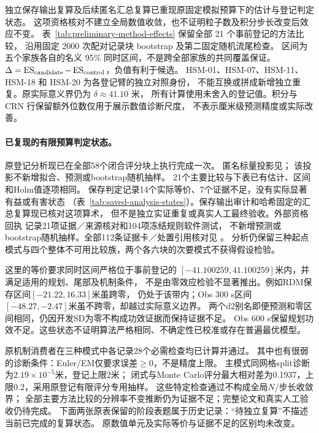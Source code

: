 独立保存输出复算及后续匿名汇总复算已重现原固定模拟预算下的估计与登记判定状态。
这项资格核对不建立全局数值收敛，也不证明粒子数及积分步长改变后效应不变。
表~\ref{tab:preliminary-method-effects} 保留全部 21 个事前登记的方法比较，
沿用固定 2000 次配对记录块 bootstrap 及第二固定随机流尾检查。
区间为五个家族各自的名义 95\% 同时区间，不是跨全部家族的共同覆盖保证。
$\Delta=\operatorname{ES}_{\mathrm{candidate}}-\operatorname{ES}_{\mathrm{control}}$，负值有利于候选。
HSM-01、HSM-07、HSM-11、HSM-18 和 HSM-20 为各登记臂的独立对照身份，
不能互换或拼成新增独立重复。原实际意义界仍为 $\delta\approx41.10$ 米，
所有计算使用未舍入的登记值。积分与 CRN 行保留额外位数仅用于展示数值诊断尺度，
不表示厘米级预测精度或实际改善。

\paragraph{已复现的有限预算判定状态。}
\label{sec:saved-analysis-status}\hypertarget{sec:saved-analysis-status}{}
原登记分析现已在全部58个闭合评分块上执行完成一次。
匿名标量投影见；
该投影不新增拟合、预测或bootstrap随机抽样。
21个主要比较与下表已有估计、区间和Holm值逐项相同。
保存判定记录14个实际等价、7个证据不足，没有实际显著有益或有害状态
（表~\ref{tab:saved-analysis-states}）。保存输出审计和哈希固定的汇总复算现已核对这项算术，
但不是独立实证重复或真实人工最终验收。外部资格回执
记录21项证据／来源核对和104项冻结规则软件测试，
不新增预测或bootstrap随机抽样。全部112条证据卡／处置引用核对见
。
分析仍保留三种起点模式与四个整体不可用比较族，两个各六块的次要模式不获得假设检验。

这里的等价要求同时区间严格位于事前登记的
$[-41.100259,41.100259]$米内，并满足适用的规划、尾部及机制条件，
不是由零效应检验不显著推出。例如RDM保存区间$[-21.22,16.33]$米虽跨零，
仍处于该带内；Obs 300 s区间$[-48.27,-2.47]$米虽不跨零，却越过实际意义边界。
两个d2别名即便预测和零区间相同，仍因开发SD为零不构成功效证据而保持证据不足。
Obs 600 s保留规划功效不足。这些状态不证明算法严格相同、不确定性已校准或存在普遍最优模型。

原机制消费者在三种模式中各记录28个必需检查均已计算并通过。
其中也有很弱的诊断条件：Euler/EM仅要求误差$\geq0$，不是精度上限。
主模式同网格split诊断为$2.19\times10^{-5}$米，登记上限2米；
闭式与Monte Carlo评分最大相对差为0.1937，上限0.2，采用原登记有限评分专用抽样。
这些特定检查通过不构成全局$N$/步长收敛界；
全部主要方法比较的分辨率不变推断仍为证据不足；完整论文和真实人工验收仍待完成。
下面两张原表保留的阶段表题属于历史记录：“待独立复算”不描述当前已完成的复算状态。
原数值单元及实际等价与证据不足的区别均未改变。

